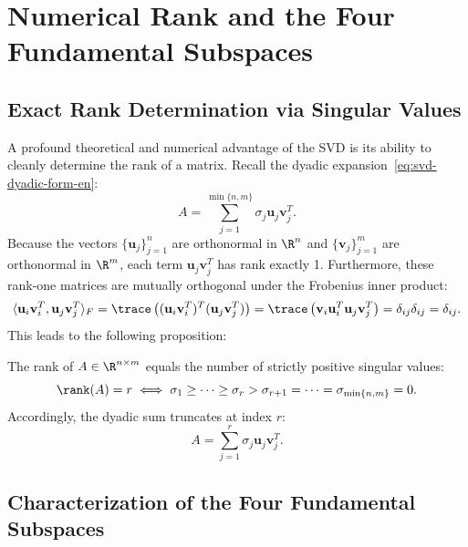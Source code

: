 \section{Numerical Rank and the Four Fundamental Subspaces}
\label{sec:svd-four-subspaces-en}

\subsection{Exact Rank Determination via Singular Values}

A profound theoretical and numerical advantage of the SVD is its ability to cleanly determine the rank of a matrix.
Recall the dyadic expansion~\eqref{eq:svd-dyadic-form-en}:
\begin{equation}
    A = \sum_{j=1}^{\min\{n, m\}} \sigma_j \mathbf{u}_j \mathbf{v}_j^T.
\end{equation}
Because the vectors $\{\mathbf{u}_j\}_{j=1}^n$ are orthonormal in $\R^n$ and $\{\mathbf{v}_j\}_{j=1}^m$ are orthonormal in $\R^m$, each term $\mathbf{u}_j \mathbf{v}_j^T$ has rank exactly 1. Furthermore, these rank-one matrices are mutually orthogonal under the Frobenius inner product:
\begin{equation}
    \langle \mathbf{u}_i \mathbf{v}_i^T, \mathbf{u}_j \mathbf{v}_j^T \rangle_F = \trace\left( (\mathbf{u}_i \mathbf{v}_i^T)^T (\mathbf{u}_j \mathbf{v}_j^T) \right) = \trace\left( \mathbf{v}_i \mathbf{u}_i^T \mathbf{u}_j \mathbf{v}_j^T \right) = \delta_{ij} \delta_{ij} = \delta_{ij}.
\end{equation}
This leads to the following proposition:

\begin{proposition}
The rank of $A \in \R^{n \times m}$ equals the number of strictly positive singular values:
\begin{equation}
    \rank(A) = r \iff \sigma_1 \ge \dots \ge \sigma_r > \sigma_{r+1} = \dots = \sigma_{\min\{n, m\}} = 0.
\end{equation}
Accordingly, the dyadic sum truncates at index $r$:
\begin{equation}
    A = \sum_{j=1}^r \sigma_j \mathbf{u}_j \mathbf{v}_j^T.
\end{equation}
\end{proposition}

\subsection{Characterization of the Four Fundamental Subspaces}

